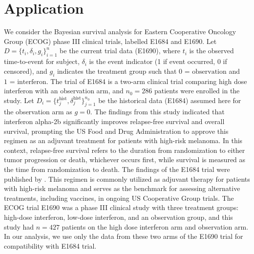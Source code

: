 \documentclass[12pt]{article}
\begin{document}
\section{Application}
\label{sec:application}
We consider the Bayesian survival analysis for Eastern Cooperative Oncology Group (ECOG) phase III clinical trials, labelled E1684 and E1690.
Let $D = \{t_i, \delta_i, g_i\}^n_{i=1}$ be the current trial data (E1690), where $t_i$ is the observed time-to-event for subject, $\delta_i$ is the event indicator (1 if event occurred, 0 if censored), and $g_i$ indicates the treatment group such that $\text{0 = observation}$ and $\text{1 = interferon}$.
The trial of E1684 is a two-arm clinical trial comparing high dose interferon with an observation arm, and $n_0 = 286$ patients were enrolled in the study. 
Let $D_i = \{t^{\text{hist}}_j, \delta^{\text{hist}}_j\}^{n_0}_{j=1}$ be the historical data (E1684) assumed here for the observation arm as $g = 0$.
The findings from this study indicated that interferon alpha-2b significantly improves relapse-free survival and overall survival, prompting the US Food and Drug Administration to approve this regimen as an adjuvant treatment for patients with high-risk melanoma.
In this context, relapse-free survival refers to the duration from randomization to either tumor progression or death, whichever occurs first, while survival is measured as the time from randomization to death.
The findings of the E1684 trial were published by \citet{kirkwood1996interferon}.
This regimen is commonly utilized as adjuvant therapy for patients with high-risk melanoma and serves as the benchmark for assessing alternative treatments, including vaccines, in ongoing US Cooperative Group trials.
The ECOG trial E1690 was a phase III clinical study with three treatment groups: high-dose interferon, low-dose interferon, and an observation group, and this study had $n = 427$ patients on the high dose interferon arm and observation arm.
In our analysis, we use only the data from these two arms of the E1690 trial for compatibility with E1684 trial.
\end{document}
